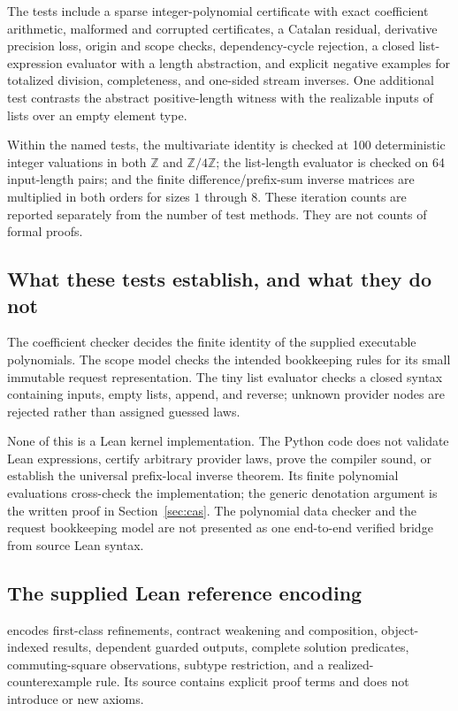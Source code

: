 \documentclass[11pt,a4paper]{article}
\newcommand{\code}[1]{\texttt{\detokenize{#1}}}
\newcommand{\Z}{\mathbb Z}
\theoremstyle{plain}
\theoremstyle{definition}
\begin{document}
The tests include a sparse integer-polynomial certificate with exact coefficient arithmetic, malformed and corrupted certificates, a Catalan residual, derivative precision loss, origin and scope checks, dependency-cycle rejection, a closed list-expression evaluator with a length abstraction, and explicit negative examples for totalized division, completeness, and one-sided stream inverses. One additional test contrasts the abstract positive-length witness with the realizable inputs of lists over an empty element type.

Within the named tests, the multivariate identity is checked at 100 deterministic integer valuations in both $\Z$ and $\Z/4\Z$; the list-length evaluator is checked on 64 input-length pairs; and the finite difference/prefix-sum inverse matrices are multiplied in both orders for sizes $1$ through $8$. These iteration counts are reported separately from the number of test methods. They are not counts of formal proofs.

\subsection{What these tests establish, and what they do not}
The coefficient checker decides the finite identity of the supplied executable polynomials. The scope model checks the intended bookkeeping rules for its small immutable request representation. The tiny list evaluator checks a closed syntax containing inputs, empty lists, append, and reverse; unknown provider nodes are rejected rather than assigned guessed laws.

None of this is a Lean kernel implementation. The Python code does not validate Lean expressions, certify arbitrary provider laws, prove the compiler sound, or establish the universal prefix-local inverse theorem. Its finite polynomial evaluations cross-check the implementation; the generic denotation argument is the written proof in Section~\ref{sec:cas}. The polynomial data checker and the request bookkeeping model are not presented as one end-to-end verified bridge from source Lean syntax.

\subsection{The supplied Lean reference encoding}
 encodes first-class refinements, contract weakening and composition, object-indexed results, dependent guarded outputs, complete solution predicates, commuting-square observations, subtype restriction, and a realized-counterexample rule. Its source contains explicit proof terms and does not introduce \code{sorry} or new axioms.
\end{document}
